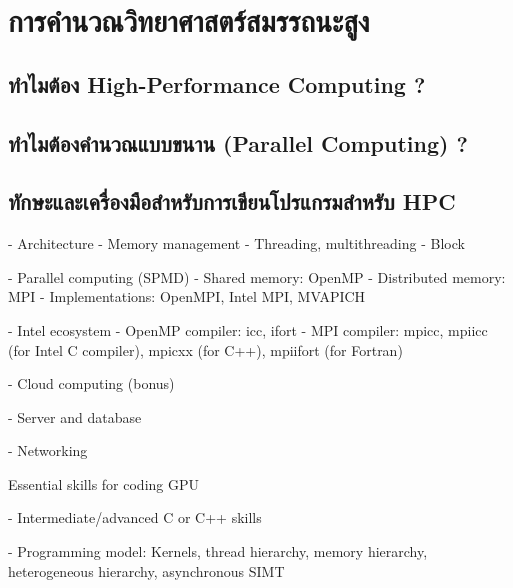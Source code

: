 

\chapter{การคำนวณวิทยาศาสตร์สมรรถนะสูง}
\label{ch:high_perf_comp}

\section{ทำไมต้อง High-Performance Computing ?}

\section{ทำไมต้องคำนวณแบบขนาน (Parallel Computing) ?}

\section{ทักษะและเครื่องมือสำหรับการเขียนโปรแกรมสำหรับ HPC}

- Architecture
  - Memory management
  - Threading, multithreading
  - Block

- Parallel computing (SPMD)
  - Shared memory: OpenMP
  - Distributed memory: MPI
    - Implementations: OpenMPI, Intel MPI, MVAPICH

- Intel ecosystem
  - OpenMP compiler: icc, ifort
  - MPI compiler: mpicc, mpiicc (for Intel C compiler), mpicxx (for C++), mpiifort (for Fortran)

- Cloud computing (bonus)

- Server and database

- Networking

Essential skills for coding GPU

- Intermediate/advanced C or C++ skills

- Programming model: Kernels, thread hierarchy, memory hierarchy, heterogeneous hierarchy, asynchronous SIMT

